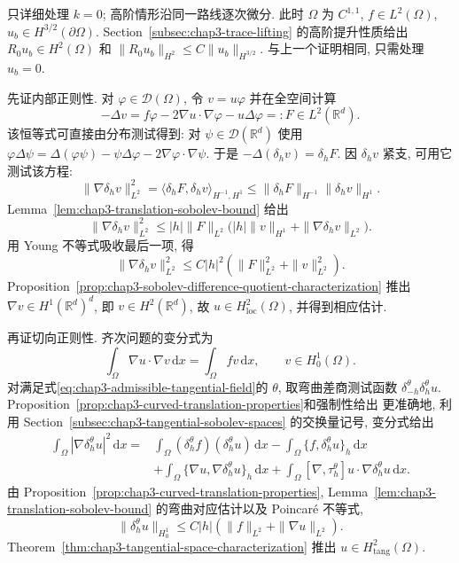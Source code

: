 \begin{Proof}
只详细处理 $k=0$; 高阶情形沿同一路线逐次微分. 此时 $\Omega$ 为 $C^{1,1}$, $f\in L^2(\Omega)$, $u_b\in H^{3/2}(\partial\Omega)$. Section~\ref{subsec:chap3-trace-lifting} 的高阶提升性质给出 $R_0u_b\in H^2(\Omega)$ 和 $\|R_0u_b\|_{H^2}\leq C\|u_b\|_{H^{3/2}}$. 与上一个证明相同, 只需处理 $u_b=0$.

先证内部正则性. 对 $\varphi\in\mathcal D(\Omega)$, 令 $v=u\varphi$ 并在全空间计算
\[
 -\Delta v=f\varphi-2\nabla u\cdot\nabla\varphi-u\Delta\varphi=:F\in L^2(\mathbb R^d).
\]
该恒等式可直接由分布测试得到: 对 $\psi\in\mathcal D(\mathbb R^d)$ 使用 $\varphi\Delta\psi=\Delta(\varphi\psi)-\psi\Delta\varphi-2\nabla\varphi\cdot\nabla\psi$. 于是 $-\Delta(\delta_hv)=\delta_hF$. 因 $\delta_hv$ 紧支, 可用它测试该方程:
\[
 \|\nabla\delta_hv\|_{L^2}^2
 =\langle\delta_hF,\delta_hv\rangle_{H^{-1},H^1}
 \leq\|\delta_hF\|_{H^{-1}}\|\delta_hv\|_{H^1}.
\]
Lemma~\ref{lem:chap3-translation-sobolev-bound} 给出
\[
 \|\nabla\delta_hv\|_{L^2}^2
 \leq|h|\|F\|_{L^2}
 \bigl(|h|\|v\|_{H^1}+\|\nabla\delta_hv\|_{L^2}\bigr).
\]
用 Young 不等式吸收最后一项, 得
\[
 \|\nabla\delta_hv\|_{L^2}^2
 \leq C|h|^2(\|F\|_{L^2}^2+\|v\|_{L^2}^2).
\]
Proposition~\ref{prop:chap3-sobolev-difference-quotient-characterization} 推出 $\nabla v\in H^1(\mathbb R^d)^d$, 即 $v\in H^2(\mathbb R^d)$, 故 $u\in H^2_{\mathrm{loc}}(\Omega)$, 并得到相应估计.

再证切向正则性. 齐次问题的变分式为
\begin{equation}
 \int_\Omega\nabla u\cdot\nabla v\,\mathrm dx
 =\int_\Omega fv\,\mathrm dx,
 \qquad v\in H_0^1(\Omega).
 \label{eq:chap3-dirichlet-variational-form}
\end{equation}
对满足式\eqref{eq:chap3-admissible-tangential-field}的 $\theta$, 取弯曲差商测试函数 $\delta_{-h}^\theta\delta_h^\theta u$. Proposition~\ref{prop:chap3-curved-translation-properties}和强制性给出
更准确地, 利用 Section~\ref{subsec:chap3-tangential-sobolev-spaces} 的交换量记号, 变分式给出
\begin{align*}
 \int_\Omega|\nabla\delta_h^\theta u|^2\,\mathrm dx
 ={}&\int_\Omega(\delta_h^\theta f)(\delta_h^\theta u)\,\mathrm dx
 -\int_\Omega\{f,\delta_h^\theta u\}_h\,\mathrm dx\\
 &+\int_\Omega\{\nabla u,\nabla\delta_h^\theta u\}_h\,\mathrm dx
 +\int_\Omega[\nabla,\tau_h^\theta]u\cdot\nabla\delta_h^\theta u\,\mathrm dx.
\end{align*}
由 Proposition~\ref{prop:chap3-curved-translation-properties}, Lemma~\ref{lem:chap3-translation-sobolev-bound} 的弯曲对应估计以及 Poincar\'e 不等式,
\[
 \|\delta_h^\theta u\|_{H_0^1}\leq C|h|(\|f\|_{L^2}+\|\nabla u\|_{L^2}).
\]
Theorem~\ref{thm:chap3-tangential-space-characterization} 推出 $u\in H_{\mathrm{tang}}^2(\Omega)$.


\end{Proof}
